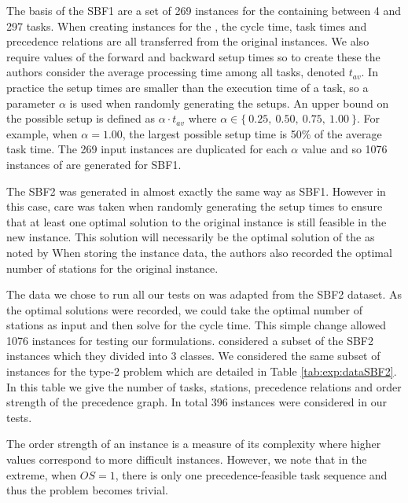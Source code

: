The basis of the SBF1 are a set of 269 instances
for the  containing between 4 and 297 tasks.
When creating instances for the , the cycle time,
task times and precedence relations are all transferred from
the original instances.
We also require values of the forward and backward setup times \ap 
so to create these the authors consider the average processing
time among all tasks, denoted $t_{av}$.
In practice the setup times are smaller than the execution time
of a task, so a parameter $\alpha$ is used when randomly generating
the setups.
An upper bound on the possible setup is defined as $\alpha\cdot t_{av}$
where $\alpha\in\{\:0.25,\:0.50,\:0.75,\:1.00\:\}$.
For example, when $\alpha=1.00$, the largest possible setup time
is 50\% of the average task time.
The 269 input instances are duplicated for each $\alpha$ value
and so 1076 instances of  are generated for SBF1.

The SBF2 was generated in almost exactly the same way as SBF1.
However in this case,
care was taken when randomly generating the setup times to ensure
that at least one optimal solution to the original  instance
is still feasible in the new  instance.
This solution will necessarily be the optimal solution
of the  as noted by \citeauthor{Scholl2013}
When storing the instance data, the authors also recorded the
optimal number of stations for the original  instance.

The data we chose to run all our tests on was adapted from the SBF2
dataset.
As the optimal solutions were recorded,
we could take the optimal number of stations as input
and then solve for the cycle time.
This simple change allowed 1076 instances for testing our formulations.
 considered a subset of the SBF2 instances
which they divided into 3 classes.
We considered the same subset of instances for the type-2 problem
which are detailed in Table \ref{tab:exp:dataSBF2}.
In this table we give the number of tasks, stations, precedence
relations and order strength of the precedence graph.
In total 396 instances were considered in our tests.

The order strength of an instance is a measure of its complexity
where higher values correspond to more difficult instances.
However, we note that in the extreme, when $OS=1$, there is only one 
precedence-feasible task sequence and thus the problem becomes trivial.

